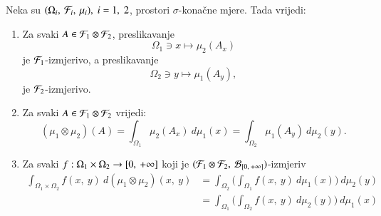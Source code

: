 \begin{zad} \label{zad:4.15}
    Neka su $(\Omega_i, \: \mathcal{F}_i, \: \mu_i), \; i = 1, \; 2$, prostori $\sigma$-kona\v cne mjere.
    Tada vrijedi:
    \begin{enumerate}[label=(\roman*)]
        \item Za svaki $A \in \mathcal{F}_1 \otimes \mathcal{F}_2$, preslikavanje
        \begin{equation*}
            \Omega_1 \ni x \mapsto \mu_2 (A_x)
        \end{equation*}
        je $\mathcal{F}_1$-izmjerivo, a preslikavanje
        \begin{equation*}
            \Omega_2 \ni y \mapsto \mu_1 (A_y),
        \end{equation*}
        je $\mathcal{F}_2$-izmjerivo.
        \item Za svaki $A \in \mathcal{F}_1 \otimes \mathcal{F}_2$ vrijedi:
        \begin{equation*}
            (\mu_1 \otimes \mu_2) (A) = \int_{\Omega_1} \mu_2 (A_x) \: d \mu_1(x) = \int_{\Omega_2} \mu_1 (A_y) \: d \mu_2 (y).
        \end{equation*}
        \item Za svaki $f: \Omega_1 \times \Omega_2 \to [{0}, \:{+\infty}]$ koji je $({\mathcal{F}_1 \otimes \mathcal{F}_2}, \: {\mathcal{B}_{[{0}, \:{+\infty}]}})$-izmjeriv
        \begin{align*}
            \int_{\Omega_1 \times \Omega_2} f(x, \: y) \: d (\mu_1 \otimes \mu_2)(x, \:y) &= \int_{\Omega_2} \Big( \int_{\Omega_1} f(x, \: y) \: d \mu_1 (x) \Big) \: d \mu_2 (y)\\
            &= \int_{\Omega_1} \Big( \int_{\Omega_2} f(x, \: y) \: d \mu_2 (y) \Big) \: d \mu_1 (x)
        \end{align*}
    \end{enumerate} 
\end{zad}


